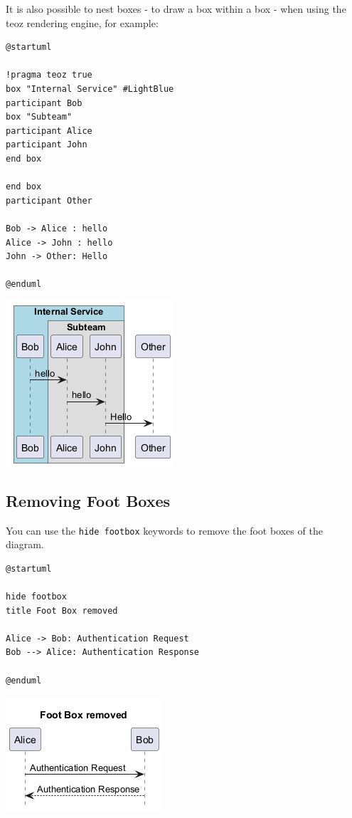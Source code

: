 It is also possible to nest boxes - to draw a box within a box - when using the teoz rendering engine, for example:


\begin{verbatim}
@startuml

!pragma teoz true
box "Internal Service" #LightBlue
participant Bob
box "Subteam"
participant Alice
participant John
end box

end box
participant Other

Bob -> Alice : hello
Alice -> John : hello
John -> Other: Hello

@enduml
\end{verbatim}
\begin{center}
\includegraphics[scale=0.60]{imgw/img-4d54316b38eb7af9b457a6c1fcb6e987.png}
\end{center}
%
%
\subsection{Removing Foot Boxes}


You can use the \texttt{hide footbox} keywords to remove the foot boxes
of the diagram.


\begin{verbatim}
@startuml

hide footbox
title Foot Box removed

Alice -> Bob: Authentication Request
Bob --> Alice: Authentication Response

@enduml
\end{verbatim}
\begin{center}
\includegraphics[scale=0.60]{imgw/img-494dcebcd04c6f6922dd00c09d52f8b5.png}
\end{center}


